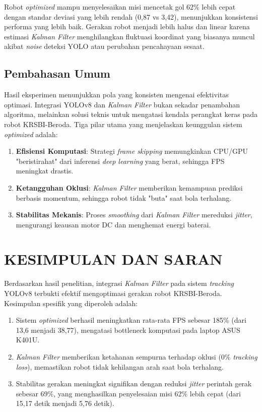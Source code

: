\documentclass[12pt,a4paper]{article}
\begin{document}
Robot \textit{optimized} mampu menyelesaikan misi mencetak gol 62\% lebih cepat dengan standar deviasi yang lebih rendah (0,87 vs 3,42), menunjukkan konsistensi performa yang lebih baik. Gerakan robot menjadi lebih halus dan linear karena estimasi \textit{Kalman Filter} menghilangkan fluktuasi koordinat yang biasanya muncul akibat \textit{noise} deteksi YOLO atau perubahan pencahayaan sesaat.

\subsection{Pembahasan Umum}
Hasil eksperimen menunjukkan pola yang konsisten mengenai efektivitas optimasi. Integrasi YOLOv8 dan \textit{Kalman Filter} bukan sekadar penambahan algoritma, melainkan solusi teknis untuk mengatasi kendala perangkat keras pada robot KRSBI-Beroda. Tiga pilar utama yang menjelaskan keunggulan sistem \textit{optimized} adalah:

\begin{enumerate}
    \item \textbf{Efisiensi Komputasi}: Strategi \textit{frame skipping} memungkinkan CPU/GPU "beristirahat" dari inferensi \textit{deep learning} yang berat, sehingga FPS meningkat drastis.
    \item \textbf{Ketangguhan Oklusi}: \textit{Kalman Filter} memberikan kemampuan prediksi berbasis momentum, sehingga robot tidak "buta" saat bola terhalang.
    \item \textbf{Stabilitas Mekanis}: Proses \textit{smoothing} dari \textit{Kalman Filter} mereduksi \textit{jitter}, mengurangi keausan motor DC dan menghemat energi baterai.
\end{enumerate}

\section{KESIMPULAN DAN SARAN}

Berdasarkan hasil penelitian, integrasi \textit{Kalman Filter} pada sistem \textit{tracking} YOLOv8 terbukti efektif mengoptimasi gerakan robot KRSBI-Beroda. Kesimpulan spesifik yang diperoleh adalah:
\begin{enumerate}
    \item Sistem \textit{optimized} berhasil meningkatkan rata-rata FPS sebesar 185\% (dari 13,6 menjadi 38,77), mengatasi bottleneck komputasi pada laptop ASUS K401U.
    \item \textit{Kalman Filter} memberikan ketahanan sempurna terhadap oklusi (0\% \textit{tracking loss}), memastikan robot tidak kehilangan arah saat bola terhalang.
    \item Stabilitas gerakan meningkat signifikan dengan reduksi \textit{jitter} perintah gerak sebesar 69\%, yang menghasilkan penyelesaian misi 62\% lebih cepat (dari 15,17 detik menjadi 5,76 detik).
\end{enumerate}
\end{document}
